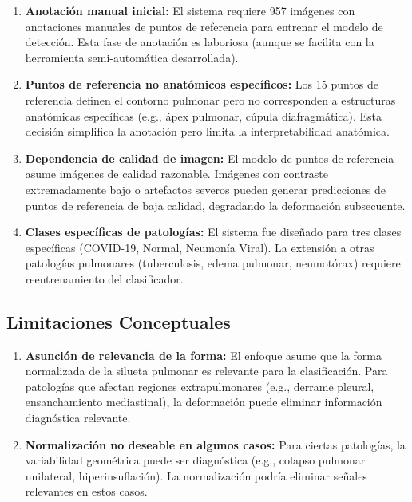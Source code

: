 \begin{enumerate}
    \item \textbf{Anotación manual inicial:} El sistema requiere 957 imágenes con anotaciones manuales de puntos de referencia para entrenar el modelo de detección. Esta fase de anotación es laboriosa (aunque se facilita con la herramienta semi-automática desarrollada).

    \item \textbf{Puntos de referencia no anatómicos específicos:} Los 15 puntos de referencia definen el contorno pulmonar pero no corresponden a estructuras anatómicas específicas (e.g., ápex pulmonar, cúpula diafragmática). Esta decisión simplifica la anotación pero limita la interpretabilidad anatómica.

    \item \textbf{Dependencia de calidad de imagen:} El modelo de puntos de referencia asume imágenes de calidad razonable. Imágenes con contraste extremadamente bajo o artefactos severos pueden generar predicciones de puntos de referencia de baja calidad, degradando la deformación subsecuente.

    \item \textbf{Clases específicas de patologías:} El sistema fue diseñado para tres clases específicas (COVID-19, Normal, Neumonía Viral). La extensión a otras patologías pulmonares (tuberculosis, edema pulmonar, neumotórax) requiere reentrenamiento del clasificador.
\end{enumerate}

\subsection{Limitaciones Conceptuales}
\label{subsec:limitaciones_conceptuales}

\begin{enumerate}
    \item \textbf{Asunción de relevancia de la forma:} El enfoque asume que la forma normalizada de la silueta pulmonar es relevante para la clasificación. Para patologías que afectan regiones extrapulmonares (e.g., derrame pleural, ensanchamiento mediastinal), la deformación puede eliminar información diagnóstica relevante.

    \item \textbf{Normalización no deseable en algunos casos:} Para ciertas patologías, la variabilidad geométrica puede ser diagnóstica (e.g., colapso pulmonar unilateral, hiperinsuflación). La normalización podría eliminar señales relevantes en estos casos.
\end{enumerate}

